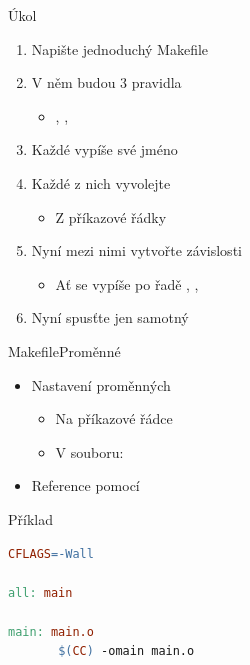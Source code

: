 \begin{frame}{Úkol}

  \begin{enumerate}
    \item Napište jednoduchý Makefile
    \item V něm budou 3 pravidla
    \begin{itemize}
      \item {}, , 
    \end{itemize}
    \item Každé vypíše své jméno
    \item Každé z nich vyvolejte
    \begin{itemize}
      \item Z příkazové řádky
    \end{itemize}

    \item Nyní mezi nimi vytvořte závislosti
    \begin{itemize}
      \item Ať se vypíše po řadě , , 
    \end{itemize}
    \item Nyní spusťte jen samotný 
  \end{enumerate}

\end{frame}

\begin{frame}[fragile]{Makefile}{Proměnné}

  \begin{itemize}
    \item Nastavení proměnných
    \begin{itemize}
      \item Na příkazové řádce
      \item V souboru: 
    \end{itemize}

    \pause

    \item Reference pomocí 
  \end{itemize}

  \begin{block}{Příklad}
  \begin{lstlisting}[language=make]
CFLAGS=-Wall

all: main

main: main.o
       $(CC) -omain main.o
  \end{lstlisting} %
  \end{block}

\end{frame}

